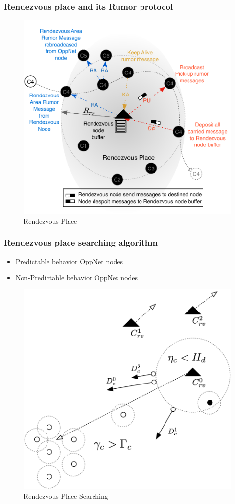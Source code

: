 \documentclass{beamer}
\begin{document}
\begin{frame}
	\frametitle{Rendezvous place and its Rumor protocol}
\begin{figure}
\centering
\includegraphics[width=0.7\linewidth]{Figures_Present/NewRendezvousPlace}
\caption{Rendezvous Place}
\label{fig:NewRendezvousPlace}
\end{figure}
\end{frame}
\begin{frame}
	\frametitle{Rendezvous place searching algorithm}
	\begin{itemize}
		\item Predictable behavior OppNet nodes
		\item Non-Predictable behavior OppNet nodes
	\end{itemize}
\begin{figure}
\centering
\includegraphics[width=0.5\linewidth]{Figures_Present/Dynamic}
\caption{Rendezvous Place Searching}
\label{fig:Dynamic}
\end{figure}
\end{frame}
\end{document}
